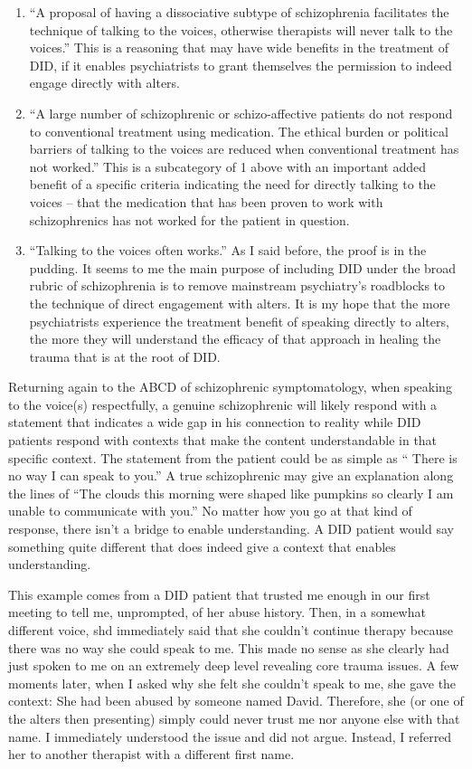 \documentclass[]{book}
\begin{document}
\begin{enumerate}
\def\labelenumi{\arabic{enumi}.}
\item
  ``A proposal of having a dissociative subtype of schizophrenia facilitates the technique of talking to the voices, otherwise therapists will never talk to the voices.'' This is a reasoning that may have wide benefits in the treatment of DID, if it enables psychiatrists to grant themselves the permission to indeed engage directly with alters.
\item
  ``A large number of schizophrenic or schizo-affective patients do not respond to conventional treatment using medication. The ethical burden or political barriers of talking to the voices are reduced when conventional treatment has not worked.'' This is a subcategory of 1 above with an important added benefit of a specific criteria indicating the need for directly talking to the voices -- that the medication that has been proven to work with schizophrenics has not worked for the patient in question.
\item
  ``Talking to the voices often works.'' As I said before, the proof is in the pudding. It seems to me the main purpose of including DID under the broad rubric of schizophrenia is to remove mainstream psychiatry's roadblocks to the technique of direct engagement with alters. It is my hope that the more psychiatrists experience the treatment benefit of speaking directly to alters, the more they will understand the efficacy of that approach in healing the trauma that is at the root of DID.
\end{enumerate}

Returning again to the ABCD of schizophrenic symptomatology, when speaking to the voice(s) respectfully, a genuine schizophrenic will likely respond with a statement that indicates a wide gap in his connection to reality while DID patients respond with contexts that make the content understandable in that specific context. The statement from the patient could be as simple as `` There is no way I can speak to you.'' A true schizophrenic may give an explanation along the lines of ``The clouds this morning were shaped like pumpkins so clearly I am unable to communicate with you.'' No matter how you go at that kind of response, there isn't a bridge to enable understanding. A DID patient would say something quite different that does indeed give a context that enables understanding.

This example comes from a DID patient that trusted me enough in our first meeting to tell me, unprompted, of her abuse history. Then, in a somewhat different voice, shd immediately said that she couldn't continue therapy because there was no way she could speak to me. This made no sense as she clearly had just spoken to me on an extremely deep level revealing core trauma issues. A few moments later, when I asked why she felt she couldn't speak to me, she gave the context: She had been abused by someone named David. Therefore, she (or one of the alters then presenting) simply could never trust me nor anyone else with that name. I immediately understood the issue and did not argue. Instead, I referred her to another therapist with a different first name.
\end{document}
